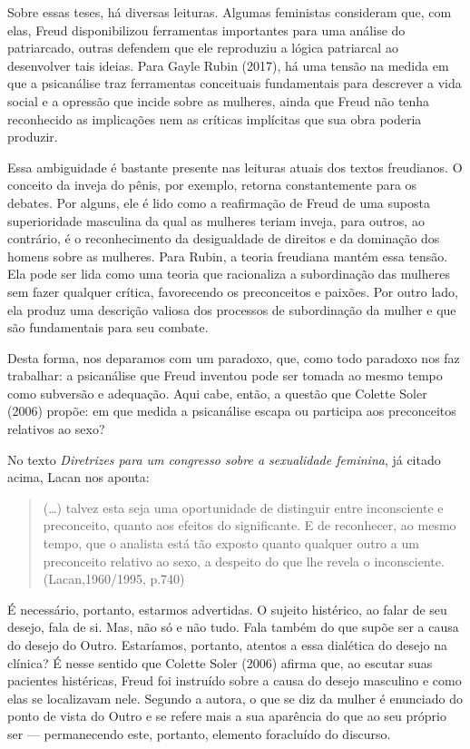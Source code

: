 Sobre essas teses, há diversas leituras. Algumas feministas consideram
que, com elas, Freud disponibilizou ferramentas importantes para uma
análise do patriarcado, outras defendem que ele reproduziu a lógica
patriarcal ao desenvolver tais ideias. Para Gayle Rubin (2017), há uma
tensão na medida em que a psicanálise traz ferramentas conceituais
fundamentais para descrever a vida social e a opressão que incide sobre
as mulheres, ainda que Freud não tenha reconhecido as implicações nem as
críticas implícitas que sua obra poderia produzir.

Essa ambiguidade é bastante presente nas leituras atuais dos textos
freudianos. O conceito da inveja do pênis, por exemplo, retorna
constantemente para os debates. Por alguns, ele é lido como a
reafirmação de Freud de uma suposta superioridade masculina da qual as
mulheres teriam inveja, para outros, ao contrário, é o reconhecimento da
desigualdade de direitos e da dominação dos homens sobre as mulheres.
Para Rubin, a teoria freudiana mantém essa tensão. Ela pode ser lida
como uma teoria que racionaliza a subordinação das mulheres sem fazer
qualquer crítica, favorecendo os preconceitos e paixões. Por outro lado,
ela produz uma descrição valiosa dos processos de subordinação da mulher
e que são fundamentais para seu combate.

Desta forma, nos deparamos com um paradoxo, que, como todo paradoxo nos
faz trabalhar: a psicanálise que Freud inventou pode ser tomada ao mesmo
tempo como subversão e adequação. Aqui cabe, então, a questão que
Colette Soler (2006) propõe: em que medida a psicanálise escapa ou
participa aos preconceitos relativos ao sexo?

No texto \emph{Diretrizes para um congresso sobre a sexualidade
feminina}, já citado acima, Lacan nos aponta:

\begin{quote}
(\ldots{}) talvez esta seja uma oportunidade de distinguir entre inconsciente
e preconceito, quanto aos efeitos do significante. E de reconhecer, ao
mesmo tempo, que o analista está tão exposto quanto qualquer outro a um
preconceito relativo ao sexo, a despeito do que lhe revela o
inconsciente. (Lacan,1960/1995, p.740)
\end{quote}

É necessário, portanto, estarmos advertidas. O sujeito histérico, ao
falar de seu desejo, fala de si. Mas, não só e não tudo. Fala também do
que supõe ser a causa do desejo do Outro. Estaríamos, portanto, atentos
a essa dialética do desejo na clínica? É nesse sentido que Colette Soler
(2006) afirma que, ao escutar suas pacientes histéricas, Freud foi
instruído sobre a causa do desejo masculino e como elas se localizavam
nele. Segundo a autora, o que se diz da mulher é enunciado do ponto de
vista do Outro e se refere mais a sua aparência do que ao seu próprio
ser --- permanecendo este, portanto, elemento foracluído do discurso.

